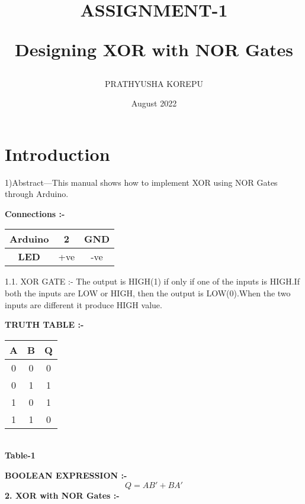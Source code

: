 \documentclass{article}
\title{ASSIGNMENT-1  

Designing XOR with NOR Gates}
\author{PRATHYUSHA KOREPU}
\date{August 2022}
\begin{document}
\maketitle

\section{Introduction}

1)Abstract—This manual shows how to  implement XOR using NOR Gates through Arduino.
\vspace{5MM}

\textbf{Connections :-}
\begin{tabular}{|c|c|c|}

\hline
\textbf{Arduino} & {2} & {GND} \\
\hline
\textbf{LED} & {+ve} & {-ve} \\
\hline
\end{tabular}

\vspace{5MM}
1.1. {XOR GATE :-}
The output is HIGH(1) if only if one of the inputs is HIGH.If both the inputs are LOW or HIGH, then the output is LOW(0).When the two inputs are different it produce HIGH value.
\vspace{5MM}

\textbf{TRUTH TABLE :-}
\vspace{5MM}
\newline

\begin{tabular}{|c|c|c|}
\hline
\textbf{A} & {B} & {Q} \\
\hline
0 & 0 & 0 \\
\hline
0 & 1 & 1 \\
\hline
1 & 0 & 1 \\
\hline
1 & 1 & 0 \\
\hline


\end{tabular}
\vspace{3mm}
\\
\caption{\textbf{Table-1}}
\vspace{5MM}
\newline

\textbf{BOOLEAN EXPRESSION :-}
\vspace{5MM}
\newline
\begin{equation}
    Q = AB' + BA'
\end{equation}
\textbf{2. XOR with NOR Gates :-}
\end{document}
